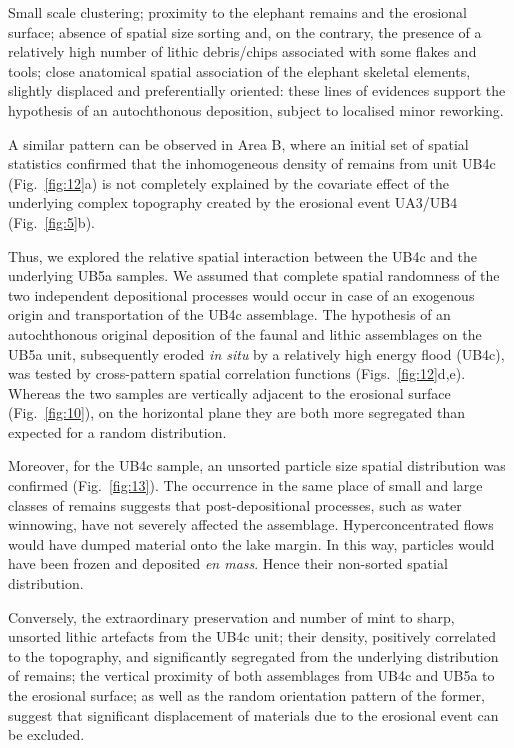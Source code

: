 \documentclass[preprint,authoryear,times]{elsarticle} %
\begin{document}
Small scale clustering; proximity to the elephant remains and the erosional surface; absence of spatial size sorting and, on the contrary, the presence of a relatively high number of lithic debris/chips associated with some flakes and tools; close anatomical spatial association of the elephant skeletal elements, slightly displaced and preferentially oriented: these lines of evidences support the hypothesis of an autochthonous deposition, subject to localised minor reworking.


A similar pattern can be observed in Area B, where an initial set of spatial statistics confirmed that the inhomogeneous density of remains from unit UB4c (Fig.~\ref{fig:12}a) is not completely explained by the covariate effect of the underlying complex topography created by the erosional event UA3/UB4 (Fig.~\ref{fig:5}b).

Thus, we explored the relative spatial interaction between the UB4c and the underlying UB5a samples. We assumed that complete spatial randomness of the two independent depositional processes would occur in case of an exogenous origin and transportation of the UB4c assemblage. The hypothesis of an autochthonous original deposition of the faunal and lithic assemblages on the UB5a unit, subsequently eroded \emph{in situ} by a relatively high energy flood (UB4c), was tested by cross-pattern spatial correlation functions (Figs.~\ref{fig:12}d,e). Whereas the two samples are vertically adjacent to the erosional surface (Fig.~\ref{fig:10}), on the horizontal plane they are both more segregated than expected for a random distribution.

Moreover, for the UB4c sample, an unsorted particle size spatial distribution was confirmed (Fig.~\ref{fig:13}). The occurrence in the same place of small and large classes of remains suggests that post-depositional processes, such as water winnowing, have not severely affected the assemblage. Hyperconcentrated flows would have dumped material onto the lake margin. In this way, particles would have been frozen and deposited \emph{en mass}. Hence their non-sorted spatial distribution.

Conversely, the extraordinary preservation and number of mint to sharp, unsorted lithic artefacts from the UB4c unit; their density, positively correlated to the topography, and significantly segregated from the underlying distribution of remains; the vertical proximity of both assemblages from UB4c and UB5a to the erosional surface; as well as the random orientation pattern of the former, suggest that significant displacement of materials due to the erosional event can be excluded.
\end{document}
